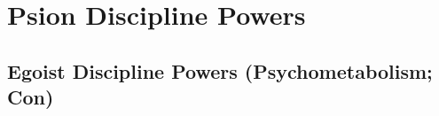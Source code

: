\section{Psion Discipline Powers}



\subsection{Egoist Discipline Powers {\normalsize(Psychometabolism; Con)}}
\begin{enumerate*}
\item
\item
\item
\item
\item
\item
\item
\item
\item
\end{enumerate*}



